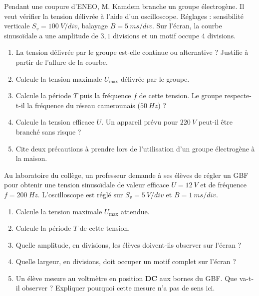 \documentclass[11pt]{article}
\begin{document}
\begin{exercice}
Pendant une coupure d'ENEO, M. Kamdem branche un groupe électrogène. Il veut vérifier la tension délivrée à l'aide d'un oscilloscope. Réglages : sensibilité verticale $S_v = \SI{100}{V/div}$, balayage $B = \SI{5}{ms/div}$. Sur l'écran, la courbe sinusoïdale a une amplitude de $3,1$ divisions et un motif occupe $4$ divisions.
\begin{enumerate}
\item La tension délivrée par le groupe est-elle continue ou alternative ? Justifie à partir de l'allure de la courbe.
\item Calcule la tension maximale $U_{\max}$ délivrée par le groupe.
\item Calcule la période $T$ puis la fréquence $f$ de cette tension. Le groupe respecte-t-il la fréquence du réseau camerounais ($\SI{50}{Hz}$) ?
\item Calcule la tension efficace $U$. Un appareil prévu pour $\SI{220}{V}$ peut-il être branché sans risque ?
\item Cite deux précautions à prendre lors de l'utilisation d'un groupe électrogène à la maison.
\end{enumerate}
\end{exercice}

\begin{exercice}
Au laboratoire du collège, un professeur demande à ses élèves de régler un GBF pour obtenir une tension sinusoïdale de valeur efficace $U = \SI{12}{V}$ et de fréquence $f = \SI{200}{Hz}$. L'oscilloscope est réglé sur $S_v = \SI{5}{V/div}$ et $B = \SI{1}{ms/div}$.
\begin{enumerate}
\item Calcule la tension maximale $U_{\max}$ attendue.
\item Calcule la période $T$ de cette tension.
\item Quelle amplitude, en divisions, les élèves doivent-ils observer sur l'écran ?
\item Quelle largeur, en divisions, doit occuper un motif complet sur l'écran ?
\item Un élève mesure au voltmètre en position \textbf{DC} aux bornes du GBF. Que va-t-il observer ? Expliquer pourquoi cette mesure n'a pas de sens ici.
\end{enumerate}
\end{exercice}
\end{document}
